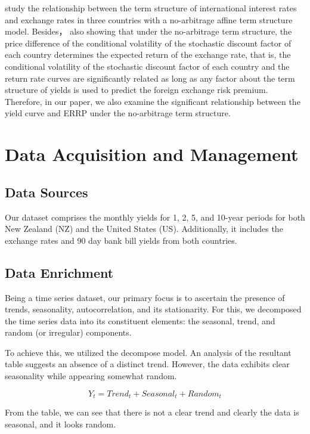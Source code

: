 \documentclass[10pt]{article}
\begin{document}
\cite{kaminska2013global} study the relationship between the term structure of international interest rates and exchange rates in three countries with  a no-arbitrage affine term structure model. Besides，\cite{ang2010yield} also showing that under the no-arbitrage term structure, the price difference of the conditional volatility of the stochastic discount factor of each country determines the expected return of the exchange rate, that is, the conditional volatility of the stochastic discount factor of each country and the return rate curves are significantly related as long as any factor about the term structure of yields is used to predict the foreign exchange risk premium. Therefore, in our paper, we also examine the significant relationship between the yield curve and ERRP under the no-arbitrage term structure.






\section{Data Acquisition and Management}

\subsection{Data Sources}
Our dataset comprises the monthly yields for 1, 2, 5, and 10-year periods for both New Zealand (NZ) and the United States (US). Additionally, it includes the exchange rates and 90 day bank bill yields from both countries.



\subsection{Data Enrichment}

Being a time series dataset, our primary focus is to ascertain the presence of trends, seasonality, autocorrelation, and its stationarity. For this, we decomposed the time series data into its constituent elements: the seasonal, trend, and random (or irregular) components.

To achieve this, we utilized the decompose model. An analysis of the resultant table suggests an absence of a distinct trend. However, the data exhibits clear seasonality while appearing somewhat random.

\[Y_{t}=Trend_{t}+Seasonal_{t}+Random_{t}\]

From the table, we can see that there is not a clear trend and clearly the data is seasonal, and it looks random.
\end{document}
